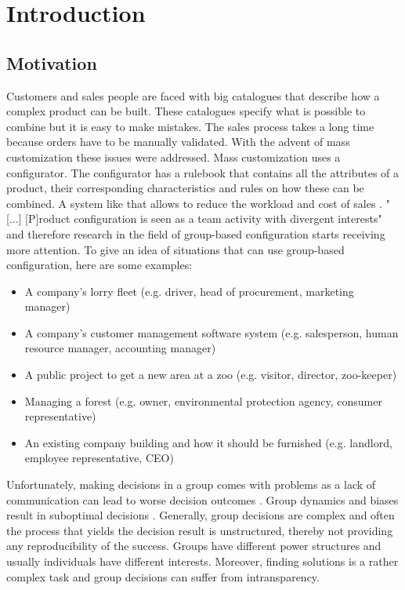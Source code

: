 \chapter{Introduction}
\label{ch:Introduction}

\section{Motivation}
\label{sec:Introduction:Goals}

Customers and sales people are faced with big catalogues that describe how a complex product can be built. These catalogues specify what is possible to combine but it is easy to make mistakes. The sales process takes a long time because orders have to be manually validated. With the advent of mass customization these issues were addressed. Mass customization uses a configurator. The configurator has a rulebook that contains all the attributes of a product, their corresponding characteristics and rules on how these can be combined. A system like that allows to reduce the workload and cost of sales \cite{shafieeCostBenefitAnalysis2018}. "[...] [P]roduct configuration is seen as a team activity with divergent interests" \cite{mendoncaCollaborativeProductConfiguration2008} and therefore research in the field of group-based configuration starts receiving more attention. 
To give an idea of situations that can use group-based configuration, here are some examples:
\begin{itemize}
    \item A company's lorry fleet (e.g. driver, head of procurement, marketing manager)
    \item A company's customer management software system (e.g. salesperson, human resource manager, accounting manager)
    \item A public project to get a new area at a zoo (e.g. visitor, director, zoo-keeper)
    \item Managing a forest (e.g. owner, environmental protection agency, consumer representative)
    \item An existing company building and how it should be furnished (e.g. landlord, employee representative, CEO)
\end{itemize}

Unfortunately, making decisions in a group comes with problems as a lack of communication can lead to worse decision outcomes \cite{atasItemRecommendationUsing2017}. Group dynamics and biases result in suboptimal decisions \cite{kerrBiasJudgmentComparing1996}.
Generally, group decisions are complex and often the process that yields the decision result is unstructured, thereby not providing any reproducibility of the success. Groups have different power structures and usually individuals have different interests. Moreover, finding solutions is a rather complex task and group decisions can suffer from intransparency.

